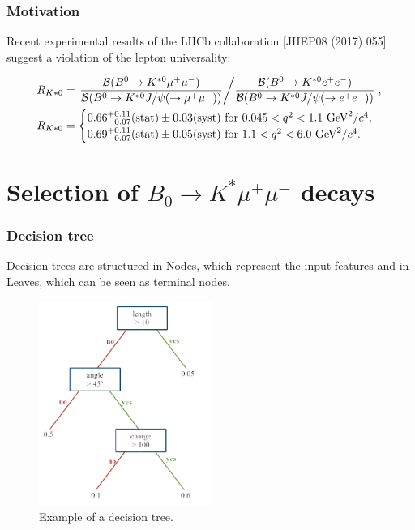 \documentclass{beamer}
\begin{document}
\begin{frame}
  \frametitle{Motivation}

Recent experimental results of the LHCb collaboration [JHEP08 (2017) 055] suggest a violation of the lepton universality:

  \begin{equation}
\begin{split}
R_{K*0} &= \left. \dfrac{\mathcal{B}(B^0 \rightarrow K^{*0} \mu^+ \mu^-)}{\mathcal{B}(B^0 \rightarrow K^{*0} J/\psi(\rightarrow \mu^+ \mu^-))} \middle/   \dfrac{\mathcal{B}(B^0 \rightarrow K^{*0} e^+ e^-)}{\mathcal{B} ( B^0 \rightarrow K^{*0} J/\psi(\rightarrow e^+ e^-))}  \right. , \\
R_{K*0} &=   \begin{cases}
  0.66^{+0.11}_{-0.07} (\text{stat}) \pm 0.03 (\text{syst}) \text{ for } 0.045 < q^2 < 1.1 \text{ GeV}^2/c^4, \\
  0.69^{+0.11}_{-0.07} (\text{stat}) \pm 0.05 (\text{syst}) \text{ for } 1.1 < q^2 < 6.0 \text{ GeV}^2/c^4.
\end{cases}
\end{split}
\end{equation}

\end{frame}




\section{Selection of $B_0 \rightarrow K^* \mu^+ \mu^-$ decays}



\begin{frame}
  \frametitle{Decision tree}

Decision trees are structured in Nodes, which represent the input features and in Leaves, which can be seen as terminal nodes.

  \begin{figure}
   \includegraphics[width=0.5\textwidth]{figures/decision_tree}
   \caption{Example of a decision tree.}
   \label{fig:tree}
  \end{figure}
\end{frame}
\end{document}
